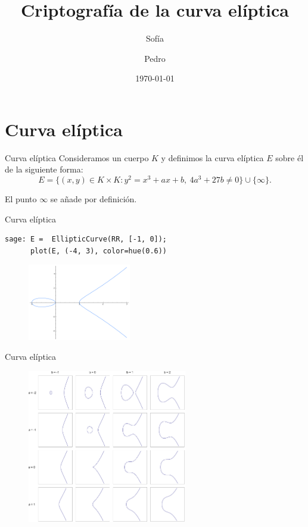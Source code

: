 \documentclass[12pt]{beamer}
\title{Criptografía de la curva elíptica}
\author{Sofía \and Pedro}
\date{\today}
\begin{document}
\frame{\titlepage}

\frame{\tableofcontents}

\section{Curva elíptica}\label{curva}
\begin{frame}[fragile]{Curva elíptica}
Consideramos un cuerpo $K$ y definimos la curva elíptica $E$ sobre él de la siguiente forma:
\[E = \{(x,y) \in K\times K : y^2 = x^3 + ax +b,\ 4a^3+27b \neq 0\} \cup \{\infty\}.
\]

El punto $\infty$ se añade por definición.
\end{frame}

\begin{frame}[fragile]{Curva elíptica}
\begin{lstlisting}[label={cod:ej1}, caption={Curva elíptica $y^2=x^3-x$}, morekeywords={sage}]
sage: E =  EllipticCurve(RR, [-1, 0]);
      plot(E, (-4, 3), color=hue(0.6))
\end{lstlisting}

\begin{figure}[H]
    \centering
    \includegraphics[height=0.4\textwidth, width=0.4\textwidth]{ej1}
    \label{fig:ej1}
\end{figure}

\end{frame}

\begin{frame}[fragile]{Curva elíptica}
\begin{figure}[H]
    \centering
    \includegraphics[width=0.62\textwidth]{EllipticCurveCatalog}
    \label{fig:EllipticCurveCatalog}
\end{figure}
\end{frame}
\end{document}
